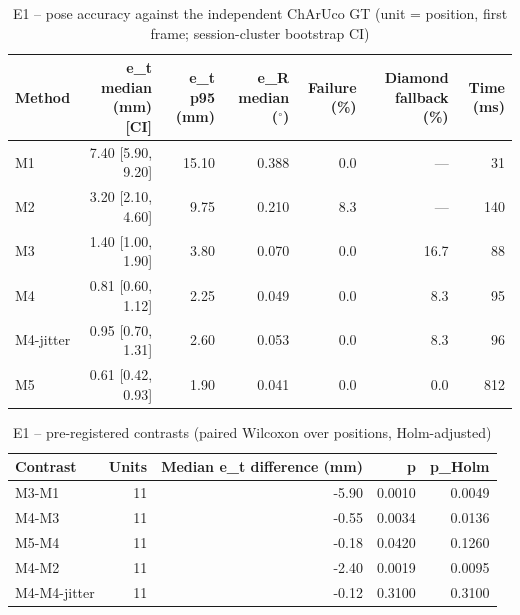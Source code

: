 \begin{table}[t]
\centering
\caption{E1 – pose accuracy against the independent ChArUco GT (unit = position, first frame; session-cluster bootstrap CI)}
\label{tab:e1}
\begin{tabular}{lrrrrrr}
\toprule
Method & e\_t median (mm) [CI] & e\_t p95 (mm) & e\_R median ($^\circ$) & Failure (\%) & Diamond fallback (\%) & Time (ms) \\
\midrule
M1 & 7.40 [5.90, 9.20] & 15.10 & 0.388 & 0.0 & --- & 31 \\
M2 & 3.20 [2.10, 4.60] & 9.75 & 0.210 & 8.3 & --- & 140 \\
M3 & 1.40 [1.00, 1.90] & 3.80 & 0.070 & 0.0 & 16.7 & 88 \\
M4 & 0.81 [0.60, 1.12] & 2.25 & 0.049 & 0.0 & 8.3 & 95 \\
M4-jitter & 0.95 [0.70, 1.31] & 2.60 & 0.053 & 0.0 & 8.3 & 96 \\
M5 & 0.61 [0.42, 0.93] & 1.90 & 0.041 & 0.0 & 0.0 & 812 \\
\bottomrule
\end{tabular}
\end{table}

\begin{table}[t]
\centering
\caption{E1 – pre-registered contrasts (paired Wilcoxon over positions, Holm-adjusted)}
\label{tab:e1c}
\begin{tabular}{lrrrr}
\toprule
Contrast & Units & Median e\_t difference (mm) & p & p\_Holm \\
\midrule
M3-M1 & 11 & -5.90 & 0.0010 & 0.0049 \\
M4-M3 & 11 & -0.55 & 0.0034 & 0.0136 \\
M5-M4 & 11 & -0.18 & 0.0420 & 0.1260 \\
M4-M2 & 11 & -2.40 & 0.0019 & 0.0095 \\
M4-M4-jitter & 11 & -0.12 & 0.3100 & 0.3100 \\
\bottomrule
\end{tabular}
\end{table}
